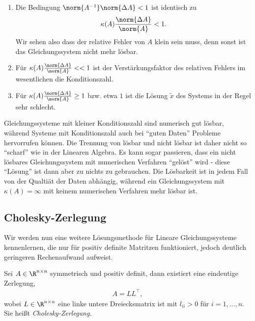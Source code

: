 \begin{bemn}[Bemerkungen.]
\begin{enumerate}[label=\arabic{*}.)]
\item Die Bedingung $\norm{A^{-1}}\norm{\Delta A} < 1$ ist identisch zu
\begin{align*}
\kappa(A)\frac{\norm{\Delta A}}{\norm{A}} < 1.
\end{align*}
Wir sehen also dass der relative Fehler von $A$ klein sein muss, denn sonst ist
das Gleichungssystem nicht mehr lösbar.
\item Für $\kappa(A)\frac{\norm{\Delta A}}{\norm{A}} << 1$ ist der
Verstärkungsfaktor des relativen Fehlers im wesentlichen die Konditionszahl.
\item Für $\kappa(A)\frac{\norm{\Delta A}}{\norm{A}}\ge 1$ bzw. etwa $1$
ist die Lösung $\tilde{x}$ des Systems in der Regel sehr schlecht.\maphere 
\end{enumerate}
\end{bemn}
Gleichungssysteme mit kleiner Konditionszahl sind numerisch gut lösbar,
während Systeme mit Konditionszahl auch bei ``guten Daten'' Probleme
hervorrufen können. Die Trennung von lösbar und nicht lösbar ist daher nicht
so ``scharf'' wie in der Linearen Algebra. Es kann sogar passieren, dass ein
nicht lösbares Gleichungssystem mit numerischen Verfahren ``gelöst'' wird -
diese ``Lösung'' ist dann aber zu nichts zu gebrauchen. Die Lösbarkeit ist in jedem
Fall von der Qualtiät der Daten abhängig, während ein Gleichungssystem mit
$\kappa(A) = \infty$ mit keinem numerischen Verfahren mehr lösbar ist.

\subsection{Cholesky-Zerlegung}

Wir werden nun eine weitere Lösungsmethode für Lineare Gleichungssysteme
kennenlernen, die nur für positiv definite Matritzen funktioniert, jedoch
deutlich geringeren Rechenaufwand aufweist.

\begin{prop}
\label{prop:2.14}
Sei $A\in\R^{n\times n}$ symmetrisch und positiv definit, dann existiert eine
eindeutige Zerlegung,
\begin{align*}
A = LL^\top,
\end{align*}
wobei $L\in\R^{n\times n}$ eine linke untere Dreiecksmatrix ist mit
$l_{ii}>0$ für $i=1,\ldots,n$. Sie heißt \emph{Cholesky-Zerlegung}.\fishhere
\end{prop}

